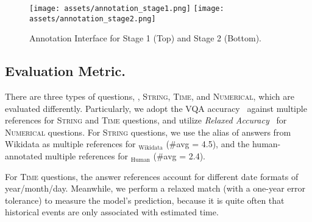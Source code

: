 \documentclass[11pt]{article}
\begin{document}
\begin{figure*}[ht!]
    \centering
    \texttt{[image: assets/annotation\_stage1.png]}
    \texttt{[image: assets/annotation\_stage2.png]}
    \caption{Annotation Interface for Stage 1 (Top) and Stage 2 (Bottom).}
    \label{fig:annotation_interface}
\end{figure*}

\subsection{Evaluation Metric.}
\label{appendix:metric}
There are three types of questions, \ie, \textsc{String}, \textsc{Time}, and \textsc{Numerical}, which are evaluated differently. 
Particularly, we adopt the VQA accuracy~\cite{balanced_vqa_v2,marino2019ok} against multiple references for \textsc{String} and \textsc{Time} questions, and utilize {\em Relaxed Accuracy}~\cite{methani2020plotqa,masry2022chartqa} for \textsc{Numerical} questions.
For \textsc{String} questions, we use the alias of answers from Wikidata as multiple references for \ourdataset$_\text{Wikidata}$ (\#avg = 4.5), and the human-annotated multiple references for \ourdataset$_\text{Human}$ (\#avg = 2.4).
\noindent{}

For \textsc{Time} questions, the answer references account for different date formats of year/month/day.
Meanwhile, we perform a relaxed match (with a one-year error tolerance) to measure the model's prediction, because it is quite often that historical events are only associated with estimated time.
\noindent{}
\end{document}
